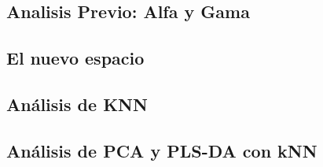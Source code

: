 \subsection{Analisis Previo: Alfa y Gama}


\newpage
\subsection{El nuevo espacio}


\newpage
\subsection{Análisis de KNN}


\newpage
\subsection{Análisis de PCA y PLS-DA con kNN}



